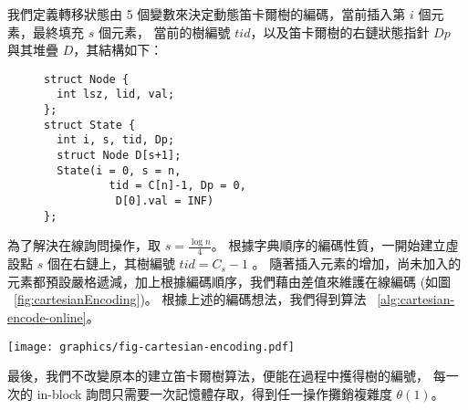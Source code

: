 

我們定義轉移狀態由 5 個變數來決定動態笛卡爾樹的編碼，當前插入第 $i$ 個元素，最終填充 $s$ 個元素，
當前的樹編號 $\mathit{tid}$，以及笛卡爾樹的右鏈狀態指針 $Dp$ 與其堆疊 $D$，其結構如下：

\begin{figure}[!thb]
  \begin{lstlisting}[frame=single,caption=State of Cartesian Tree]
struct Node {
  int lsz, lid, val;
};
struct State {
  int i, s, tid, Dp;
  struct Node D[s+1];
  State(i = 0, s = n, 
          tid = C[n]-1, Dp = 0,
           D[0].val = INF)
};
  \end{lstlisting}
\end{figure}

為了解決在線詢問操作，取 $s = \frac{\log n}{4}$。
根據字典順序的編碼性質，一開始建立虛設點 $s$ 個在右鏈上，其樹編號 $\mathit{tid} = C_s - 1$ 。
隨著插入元素的增加，尚未加入的元素都預設嚴格遞減，加上根據編碼順序，我們藉由差值來維護在線編碼 (如圖 ~\ref{fig:cartesianEncoding})。
根據上述的編碼想法，我們得到算法 ~\ref{alg:cartesian-encode-online}。



\begin{figure*}[!thb]
  \centering
  \texttt{[image: graphics/fig-cartesian-encoding.pdf]}
  \caption{每個區塊有 $s$ 個元素，初始情況虛設 $s$ 個點在右鏈，則具有 $s$ 個節點的 BST，其編號 $\text{tid}_0 = C_s - 1$。當插入第 $i$ 個元素時，當前編號為 $\text{tid}_i$，以節點 $A$ 為根的樹編號為 $A.\text{tid}$，若第 $i+1$ 個元素值為 $x$，其將會翻轉到 $A$ 之上，而 $A$ 成為 $x$ 的左子節點，翻轉過程中計算得到 $A.\text{tid}$，而以 $x$ 為根的樹將虛設 $s-(i+1)$ 個節點在其右鏈，最後得到 $x.\text{tid}$。根據字典順序，我們將得到 $\text{tid}_{i+1} = \text{tid}_{i} + (x.\text{tid} - A.\text{tid})$。}
  \label{fig:cartesianEncoding}
\end{figure*}

最後，我們不改變原本的建立笛卡爾樹算法，便能在過程中擭得樹的編號，
每一次的 in-block 詢問只需要一次記憶體存取，得到任一操作攤銷複雜度 $\theta(1)$。